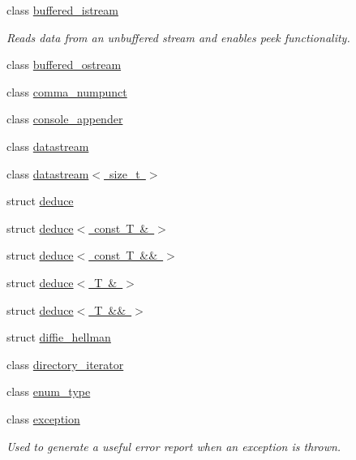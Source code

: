 \begin{DoxyCompactItemize}
class \mbox{\hyperlink{classfc_1_1buffered__istream}{buffered\+\_\+istream}}
\begin{DoxyCompactList}\small\item\em Reads data from an unbuffered stream and enables peek functionality. \end{DoxyCompactList}\item 
class \mbox{\hyperlink{classfc_1_1buffered__ostream}{buffered\+\_\+ostream}}
\item 
class \mbox{\hyperlink{classfc_1_1comma__numpunct}{comma\+\_\+numpunct}}
\item 
class \mbox{\hyperlink{classfc_1_1console__appender}{console\+\_\+appender}}
\item 
class \mbox{\hyperlink{classfc_1_1datastream}{datastream}}
\item 
class \mbox{\hyperlink{classfc_1_1datastream_3_01size__t_01_4}{datastream$<$ size\+\_\+t $>$}}
\item 
struct \mbox{\hyperlink{structfc_1_1deduce}{deduce}}
\item 
struct \mbox{\hyperlink{structfc_1_1deduce_3_01const_01_t_01_6_01_4}{deduce$<$ const T \& $>$}}
\item 
struct \mbox{\hyperlink{structfc_1_1deduce_3_01const_01_t_01_6_6_01_4}{deduce$<$ const T \&\& $>$}}
\item 
struct \mbox{\hyperlink{structfc_1_1deduce_3_01_t_01_6_01_4}{deduce$<$ T \& $>$}}
\item 
struct \mbox{\hyperlink{structfc_1_1deduce_3_01_t_01_6_6_01_4}{deduce$<$ T \&\& $>$}}
\item 
struct \mbox{\hyperlink{structfc_1_1diffie__hellman}{diffie\+\_\+hellman}}
\item 
class \mbox{\hyperlink{classfc_1_1directory__iterator}{directory\+\_\+iterator}}
\item 
class \mbox{\hyperlink{classfc_1_1enum__type}{enum\+\_\+type}}
\item 
class \mbox{\hyperlink{classfc_1_1exception}{exception}}
\begin{DoxyCompactList}\small\item\em Used to generate a useful error report when an exception is thrown.


\end{DoxyCompactList}
\end{DoxyCompactItemize}
